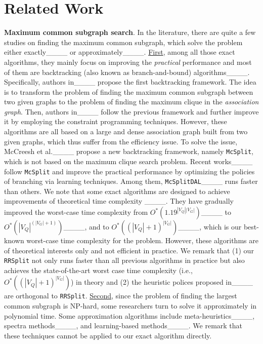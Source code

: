 \section{Related Work}
\label{sec:related}

\noindent\textbf{Maximum common subgraph search}. In the literature, there are quite a few studies on finding the maximum common subgraph, which solve the problem either exactly____ or approximately____. \underline{First}, among all those exact algorithms, they mainly focus on improving the \emph{practical} performance and most of them are backtracking (also known as branch-and-bound) algorithms____. Specifically, authors in____ propose the first backtracking framework. The idea is to transform the problem of finding the maximum common subgraph between two given graphs to the problem of finding the maximum clique in the \emph{association graph}. Then, authors in____ follow the previous framework and further improve it by employing the constraint programming techniques. However, these algorithms are all based on a large and dense association graph built from two given graphs, which thus suffer from the efficiency issue. To solve the issue, McCreesh et al.____ propose a new backtracking framework, namely \texttt{McSplit}, which is not based on the maximum clique search problem. Recent works____ follow \texttt{McSplit} and improve the practical performance by optimizing the policies of branching via learning techniques. Among them, \texttt{McSplitDAL}____ runs faster than {\cheng others.}
We note that some exact algorithms are designed 
{\chengB to achieve improvements of theoretical time complexity}
____. They have gradually improved the worst-case time complexity from $O^*(1.19^{|V_Q||V_G|})$____ to $O^*(|V_Q|^{(|V_G|+1)})$____, and {\cheng to} $O^*((|V_Q|+1)^{|V_G|})$____,
{\chengB which is our best-known {\YuiR worst-case} time complexity for the problem.}
However, these algorithms are of theoretical interests only and not efficient in practice. We remark that (1) our \texttt{RRSplit} not only runs faster than all previous algorithms in practice but also achieves the state-of-the-art worst case time complexity (i.e., $O^*((|V_Q|+1)^{|V_G|})$) in theory and (2) the heuristic polices proposed in____ are orthogonal to \texttt{RRSplit}. \underline{Second}, since the problem of finding the largest common subgraph is NP-hard, some researchers turn to solve it approximately in polynomial time. Some approximation algorithms include meta-heuristics____, spectra methods____, and learning-based methods____. We remark that these techniques cannot be applied to our exact algorithm directly.

